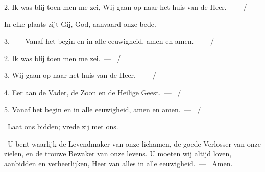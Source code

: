 \documentclass[12pt,twoside,a5paper]{article}
\begin{document}
\begin{halfparskip}
  2. Ik was blij toen men me zei, Wij gaan op naar het huis van de Heer.~--- ~/ 

  \liturgicallbracket{} In elke plaats zijt Gij, God, aanvaard onze bede.\liturgicalrbracket

  3. ~--- Vanaf het begin en in alle eeuwigheid, amen en amen.~--- ~/ 

   2. Ik was blij toen men me zei.~--- ~/ 

  3. Wij gaan op naar het huis van de Heer.~--- ~/ 

  4. Eer aan de Vader, de Zoon en de Heilige Geest.~--- ~/ 

  5. Vanaf het begin en in alle eeuwigheid, amen en amen.~--- ~/ 

  \dd~Laat ons bidden; vrede zij met ons.

  \cc~U bent waarlijk de Levendmaker van onze lichamen, de goede Verlosser van onze zielen, en de trouwe Bewaker van onze levens. U moeten wij altijd loven, aanbidden en verheerlijken, Heer van alles in alle eeuwigheid.~--- \rr~Amen.
\end{halfparskip}





\end{document}
